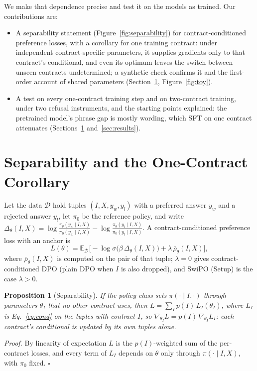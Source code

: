\documentclass[letterpaper]{article} %
\newtheorem{proposition}{Proposition}
\begin{document}

We make that dependence precise and test it on the models as trained. Our contributions are:
\begin{itemize}
    \item A separability statement (Figure~\ref{fig:separability}) for contract-conditioned preference losses, with a corollary for one training contract: under independent contract-specific parameters, it supplies gradients only to that contract's conditional, and even its optimum leaves the switch between unseen contracts undetermined; a synthetic check confirms it and the first-order account of shared parameters (Section~\ref{sec:theory}, Figure~\ref{fig:toy}).
    \item A test on every one-contract training step and on two-contract training, under two refusal instruments, and the starting points explained: the pretrained model's phrase gap is mostly wording, which SFT on one contract attenuates (Sections~\ref{sec:theory} and~\ref{sec:results}).
\end{itemize}

\section{Separability and the One-Contract Corollary}
\label{sec:theory}

Let the data $\mathcal{D}$ hold tuples $(I, X, y_w, y_l)$ with a preferred answer $y_w$ and a rejected answer $y_l$, let $\pi_0$ be the reference policy, and write $\Delta_\theta(I,X) = \log\frac{\pi_\theta(y_w\mid I,X)}{\pi_0(y_w\mid I,X)} - \log\frac{\pi_\theta(y_l\mid I,X)}{\pi_0(y_l\mid I,X)}$. A contract-conditioned preference loss with an anchor is
\begin{equation}
\label{eq:cond}
L(\theta) = \mathbb{E}_{\mathcal{D}}\big[-\log\sigma\big(\beta\,\Delta_\theta(I,X)\big) + \lambda\,\bar{\rho}_\theta(I,X)\big],
\end{equation}
where $\bar{\rho}_\theta(I,X)$ is computed on the pair of that tuple; $\lambda=0$ gives contract-conditioned DPO (plain DPO when $I$ is also dropped), and SwiPO (Setup) is the case $\lambda>0$.

\begin{proposition}[Separability]
If the policy class sets $\pi(\cdot\mid I,\cdot)$ through parameters $\theta_I$ that no other contract uses, then $L = \sum_{I} p(I)\,L_I(\theta_I)$, where $L_I$ is Eq.~\ref{eq:cond} on the tuples with contract $I$, so $\nabla_{\theta_I} L = p(I)\,\nabla_{\theta_I} L_I$: each contract's conditional is updated by its own tuples alone.
\end{proposition}
\noindent\textit{Proof.} By linearity of expectation $L$ is the $p(I)$-weighted sum of the per-contract losses, and every term of $L_I$ depends on $\theta$ only through $\pi(\cdot\mid I,X)$, with $\pi_0$ fixed. $\square$
\end{document}
